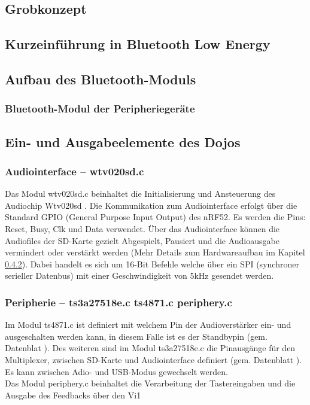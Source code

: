 \subsection{Grobkonzept}

\subsection{Kurzeinführung in Bluetooth Low Energy}

\subsection{Aufbau des Bluetooth-Moduls}

\subsubsection{Bluetooth-Modul der Peripheriegeräte}

\subsection{Ein- und Ausgabeelemente des Dojos}

\subsubsection{Audiointerface -- wtv020sd.c}
Das Modul wtv020sd.c beinhaltet die Initialisierung und Ansteuerung des Audiochip Wtv020sd \cite{WTV020}. Die Kommunikation zum Audiointerface erfolgt über die Standard GPIO (General Purpose Input Output) des nRF52. Es werden die Pins: Reset, Busy, Clk und Data verwendet. Über das Audiointerface können die Audiofiles der SD-Karte gezielt Abgespielt, Pausiert und die Audioausgabe vermindert oder verstärkt werden (Mehr Details zum Hardwareaufbau im Kapitel \ref{}). Dabei handelt es sich um 16-Bit Befehle welche über ein SPI (synchroner serieller Datenbus) mit einer Geschwindigkeit von 5kHz gesendet werden.

\subsubsection{Peripherie -- ts3a27518e.c ts4871.c periphery.c }
Im Modul ts4871.c ist definiert mit welchem Pin der Audioverstärker ein- und ausgeschalten werden kann, in diesem Falle ist es der Standbypin (gem. Datenblat \cite{TS4871}). Des weiteren sind im Modul ts3a27518e.c die Pinausgänge für den Multiplexer, zwischen SD-Karte und Audiointerface definiert (gem. Datenblatt \cite{TS3A27518E}). Es kann zwischen Adio- und USB-Modus gewechselt werden.\\
Das Modul periphery.c beinhaltet die Verarbeitung der Tastereingaben und die Ausgabe des Feedbacks über den Vi1


